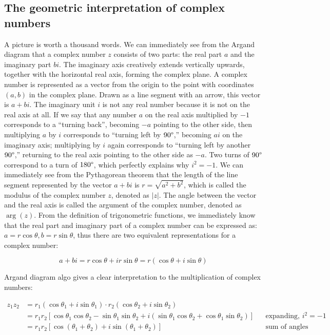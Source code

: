 \documentclass[b5paper]{article}
\begin{document}
\subsection{The geometric interpretation of complex numbers}
A picture is worth a thousand words. We can immediately see from the Argand diagram that a complex number $z$ consists of two parts: the real part $a$ and the imaginary part $bi$. The imaginary axis creatively extends vertically upwards, together with the horizontal real axis, forming the complex plane. A complex number is represented as a vector from the origin to the point with coordinates $(a, b)$ in the complex plane. Drawn as a line segment with an arrow, this vector is $a + bi$. The imaginary unit $i$ is not any real number because it is not on the real axis at all. If we say that any number $a$ on the real axis multiplied by $-1$ corresponds to a \enquote{turning back}, becoming $-a$ pointing to the other side, then multiplying $a$ by $i$ corresponds to \enquote{turning left by $90\degree$,} becoming $ai$ on the imaginary axis; multiplying by $i$ again corresponds to \enquote{turning left by another $90\degree$,} returning to the real axis pointing to the other side as $-a$. Two turns of $90\degree$ correspond to a turn of $180\degree$, which perfectly explains why $i^2 = -1$. We can immediately see from the Pythagorean theorem that the length of the line segment represented by the vector $a + bi$ is $r = \sqrt{a^2 + b^2}$, which is called the modulus of the complex number $z$, denoted as $|z|$. The angle between the vector and the real axis is called the argument of the complex number, denoted as $\arg(z)$. From the definition of trigonometric functions, we immediately know that the real part and imaginary part of a complex number can be expressed as: $a = r\cos\theta, b = r\sin\theta$, thus there are two equivalent representations for a complex number:

\[
a + bi = r\cos\theta + ir\sin\theta = r(\cos\theta + i\sin\theta)
\]

Argand diagram algo gives a clear interpretation to the multiplication of complex numbers: 

\begin{align*}
z_1z_2 &= r_1(\cos\theta_1 + i\sin\theta_1) \cdot r_2(\cos\theta_2 + i\sin\theta_2) \\
  &= r_1r_2[\cos\theta_1\cos\theta_2 - \sin\theta_1\sin\theta_2 + i(\sin\theta_1\cos\theta_2 + \cos\theta_1\sin\theta_2)] && \text{expanding, } i^2 = -1 \\
  &= r_1r_2[\cos(\theta_1 + \theta_2) + i\sin(\theta_1 + \theta_2)] && \text{sum of angles}
\end{align*}
\end{document}
